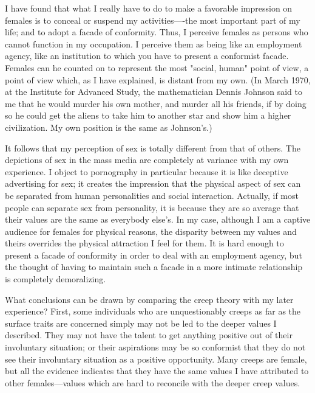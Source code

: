 \documentclass[10pt,twoside,draft]{memoir}
\begin{document}
{{{I have found that what I really have to do to make a favorable 
impression on females is to conceal or suspend my activities----the most 
important part of my life; and to adopt a facade of conformity. Thus, I 
perceive females as persons who cannot function in my occupation. I 
perceive them as being like an employment agency, like an institution to 
which you have to present a conformist facade. Females can he counted on to 
represent the most "social, human" point of view, a point of view which, as I 
have explained, is distant from my own. (In March 1970, at the Institute for 
Advanced Study, the mathematician Dennis Johnson said to me that he 
would murder his own mother, and murder all his friends, if by doing so he 
could get the aliens to take him to another star and show him a higher 
civilization. My own position is the same as Johnson's.) 

It follows that my perception of sex is totally different from that of 
others. The depictions of sex in the mass media are completely at variance 
with my own experience. I object to pornography in particular because it is 
like deceptive advertising for sex; it creates the impression that the physical 
aspect of sex can be separated from human personalities and social 
interaction. Actually, if most people can separate sex from personality, it is 
because they are so average that their values are the same as everybody else's. 
In my case, although I am a captive audience for females for physical 
reasons, the disparity between my values and theirs overrides the physical 
attraction I feel for them. It is hard enough to present a facade of 
conformity in order to deal with an employment agency, but the thought of 
having to maintain such a facade in a more intimate relationship is 
completely demoralizing. 

What conclusions can be drawn by comparing the creep theory with my 
later experience? First, some individuals who are unquestionably creeps as 
far as the surface traits are concerned simply may not be led to the deeper 
values I described. They may not have the talent to get anything positive out 
of their involuntary situation; or their aspirations may be so conformist that 
they do not see their involuntary situation as a positive opportunity. Many 
creeps are female, but all the evidence indicates that they have the same 
values I have attributed to other females---values which are hard to reconcile 
with the deeper creep values. 

}}}
\end{document}
